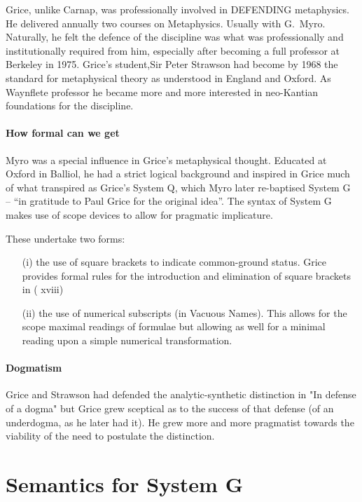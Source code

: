 \documentclass[10pt,titlepage]{book}
\begin{document}
Grice, unlike Carnap, was professionally involved in DEFENDING metaphysics.
He delivered annually two courses on Metaphysics.
Usually with G.~Myro.
Naturally, he felt the defence of the discipline was what was professionally and institutionally required from him, especially after becoming a full professor at Berkeley in 1975.
Grice's student,Sir Peter Strawson had become by 1968 the standard for metaphysical theory as understood in England and Oxford.
As Waynflete professor he became more and more interested in neo-Kantian foundations for the discipline. 

\paragraph{How formal can we get}

Myro was a special influence in Grice's metaphysical thought.
Educated at Oxford in Balliol, he had a strict logical background and inspired in Grice much of what transpired as Grice's System Q, which Myro later re-baptised System G -- ``in gratitude to Paul Grice for the original idea''.
The syntax of System G makes use of scope devices to allow for pragmatic implicature.

These undertake two forms:

\begin{itemize}
\item[(i)] the use of square brackets to indicate common-ground status.
Grice provides formal rules for the introduction and elimination of square brackets in (\cite{grice89} xviii) 
\item[(ii)] the use of numerical subscripts (in Vacuous Names).
This allows for the scope maximal readings of formulae but allowing as well for a minimal reading upon a simple numerical transformation.  
\end{itemize}

\paragraph{Dogmatism} Grice and Strawson had defended the analytic-synthetic 
distinction in "In  defense of a dogma" but Grice grew sceptical as to the success 
of that defense  (of an underdogma, as he later had it). He grew more and 
more pragmatist towards  the viability of the need to postulate the 
distinction. 

\section{Semantics for System G}
\end{document}

